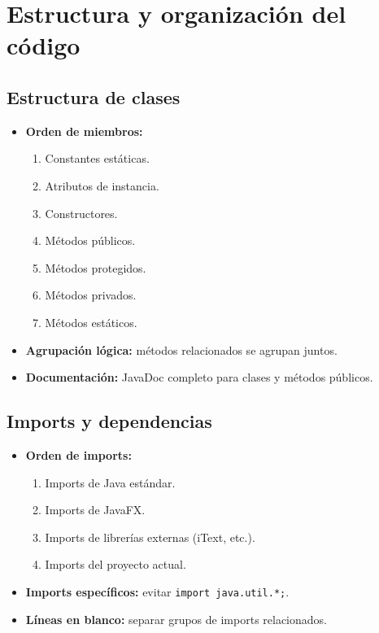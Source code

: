 \section{Estructura y organización del código}

\subsection{Estructura de clases}

\begin{itemize}
    \item \textbf{Orden de miembros:}
    \begin{enumerate}
        \item Constantes estáticas.
        \item Atributos de instancia.
        \item Constructores.
        \item Métodos públicos.
        \item Métodos protegidos.
        \item Métodos privados.
        \item Métodos estáticos.
    \end{enumerate}
    \item \textbf{Agrupación lógica:} métodos relacionados se agrupan juntos.
    \item \textbf{Documentación:} JavaDoc completo para clases y métodos públicos.
\end{itemize}

\subsection{Imports y dependencias}

\begin{itemize}
    \item \textbf{Orden de imports:}
    \begin{enumerate}
        \item Imports de Java estándar.
        \item Imports de JavaFX.
        \item Imports de librerías externas (iText, etc.).
        \item Imports del proyecto actual.
    \end{enumerate}
    \item \textbf{Imports específicos:} evitar \texttt{import java.util.*;}.
    \item \textbf{Líneas en blanco:} separar grupos de imports relacionados.
\end{itemize}

